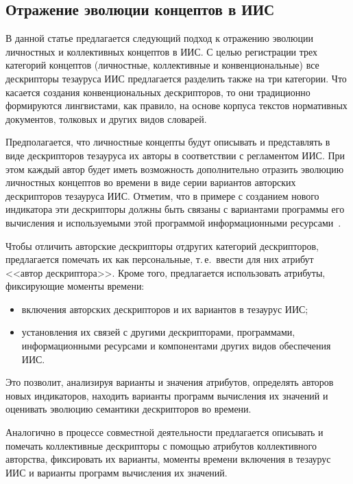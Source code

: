\begin{multicols}{2}
\section{Отражение эволюции концептов в ИИС}

   В данной статье предлагается следующий подход к отражению эволюции личностных и
коллективных концептов в ИИС. С целью регистрации трех категорий концептов
(личностные, коллективные и конвенциональные) все дескрипторы тезауруса ИИС
предлагается разделить также на три категории. Что касается создания конвенциональных
дескрипторов, то они традиционно формируются лингвистами, как правило, на основе
корпуса текс\-тов нормативных документов, толковых и других видов словарей.

   Предполагается, что личностные концепты будут описывать и представлять в виде
дескрипторов тезауруса  их авторы в соответствии с регламентом ИИС. При этом каждый
автор будет иметь возможность дополнительно отразить эволюцию личностных концептов
во времени в виде серии вариантов авторских дескрипторов тезауруса ИИС. Отметим, что в
примере с созданием нового индикатора эти дескрипторы должны быть связаны с
вариантами программы его вычисления и используемыми этой программой
информационными ресурсами~\cite{36za, 37za}.

   Чтобы отличить авторские дескрипторы от\linebreak других категорий дескрипторов, предлагается
помечать их как персональные, т.\,е.\ ввести для них атрибут <<автор дескриптора>>.
Кроме того, предлагается использовать атрибуты, фиксирующие моменты времени:
   \begin{itemize}
\item включения авторских дескрипторов и их вариантов в тезаурус ИИС;
\item установления их связей с другими дескрипторами, программами,
информационными ресурсами и компонентами других видов обеспечения ИИС.
   \end{itemize}

   Это позволит, анализируя варианты и значения атрибутов, определять авторов новых
индикаторов, находить варианты программ вычисления их значений и оценивать эволюцию
семантики дескрипторов во времени.

   Аналогично в процессе совместной дея\-тель\-ности предлагается описывать и помечать
коллективные дескрипторы с помощью атрибутов коллективного авторства, фиксировать их
варианты, моменты времени включения в тезаурус ИИС и варианты программ вычисления
их значений.


\end{multicols}
